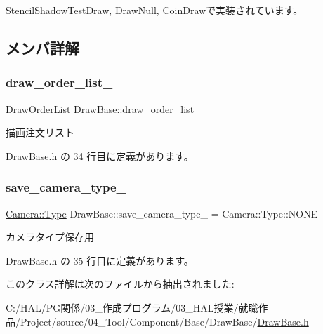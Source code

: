 \mbox{\hyperlink{class_stencil_shadow_test_draw_a0f697b6dad67048c7f8916a53cca6b1c}{Stencil\+Shadow\+Test\+Draw}}, \mbox{\hyperlink{class_draw_null_a7f0d52c5c2fb2d9b8eb423f363862290}{Draw\+Null}}, \mbox{\hyperlink{class_coin_draw_a66c03acd675ac1820977cb21015abfdb}{Coin\+Draw}}で実装されています。



\subsection{メンバ詳解}
\mbox{\label{class_draw_base_a6ebc8dc96176ddd3bd984b3d54739adb}} 
\subsubsection{\texorpdfstring{draw\+\_\+order\+\_\+list\+\_\+}{draw\_order\_list\_}}
{\footnotesize\ttfamily \mbox{\hyperlink{class_draw_order_list}{Draw\+Order\+List}} Draw\+Base\+::draw\+\_\+order\+\_\+list\+\_\+\hspace{0.3cm}{\ttfamily [private]}}



描画注文リスト 



 Draw\+Base.\+h の 34 行目に定義があります。

\mbox{\label{class_draw_base_aa8be4980756a0af7cc76dfe455c492d4}} 
\subsubsection{\texorpdfstring{save\+\_\+camera\+\_\+type\+\_\+}{save\_camera\_type\_}}
{\footnotesize\ttfamily \mbox{\hyperlink{class_camera_a3b0a1f58deca679ac665f61c480d1dcb}{Camera\+::\+Type}} Draw\+Base\+::save\+\_\+camera\+\_\+type\+\_\+ = Camera\+::\+Type\+::\+N\+O\+NE\hspace{0.3cm}{\ttfamily [private]}}



カメラタイプ保存用 



 Draw\+Base.\+h の 35 行目に定義があります。



このクラス詳解は次のファイルから抽出されました\+:\begin{DoxyCompactItemize}
\item 
C\+:/\+H\+A\+L/\+P\+G関係/03\+\_\+作成プログラム/03\+\_\+\+H\+A\+L授業/就職作品/\+Project/source/04\+\_\+\+Tool/\+Component/\+Base/\+Draw\+Base/\mbox{\hyperlink{_draw_base_8h}{Draw\+Base.\+h}}\end{DoxyCompactItemize}
